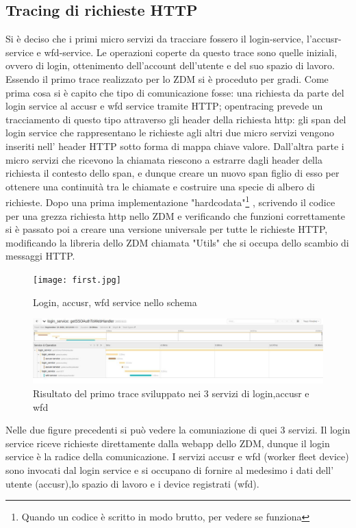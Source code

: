 \documentclass[a4paper,12pt,titlepage,italian,openany]{report}
\begin{document}
\subsection{Tracing di richieste HTTP}
Si è deciso che i primi micro servizi da tracciare fossero il login-service, l'accusr-service e wfd-service. Le operazioni coperte da questo trace sono quelle iniziali, ovvero di login, ottenimento dell'account dell'utente e del suo spazio di lavoro.
Essendo il primo trace realizzato per lo ZDM\cite{zdm:1} si è proceduto per gradi. Come prima cosa si è capito che tipo di comunicazione fosse: una richiesta da parte del login service al accusr e wfd service tramite HTTP;
opentracing\cite{opentracing:1} prevede un tracciamento di questo tipo attraverso gli header della richiesta http: gli span del login service che rappresentano le richieste agli altri due micro servizi vengono inseriti nell' header HTTP sotto forma di mappa chiave valore.
Dall'altra parte i micro servizi che ricevono la chiamata riescono a estrarre dagli header della richiesta il contesto dello span, e dunque creare un nuovo span figlio di esso per ottenere una continuità tra le chiamate e costruire una specie di albero di richieste.
Dopo una prima implementazione "hardcodata"\footnote[1]{Quando un codice è scritto in modo brutto, per vedere se funziona} , scrivendo il codice per una grezza richiesta http nello ZDM\cite{zdm:1} e verificando che funzioni correttamente si è passato poi a creare una versione universale per tutte le richieste HTTP, modificando la libreria dello ZDM\cite{zdm:1} chiamata "Utils" che si occupa dello scambio di messaggi HTTP.
\begin{figure}[H]
    \texttt{[image: first.jpg]}
    \centering
    \caption{Login, accusr, wfd service nello schema}
\end{figure}

\begin{figure}[H]
    \includegraphics[scale = 0.4]{43.jpg}
    \centering
    \caption{Risultato del primo trace sviluppato nei 3 servizi di login,accusr e wfd}
\end{figure}
Nelle due figure precedenti si può vedere la comuniazione di quei 3 servizi. Il login service riceve richieste direttamente dalla webapp dello ZDM\cite{zdm:1}, dunque il login service è la radice della comunicazione. I servizi accusr e wfd (worker fleet device) sono invocati dal login service e si occupano di fornire al medesimo i dati dell' utente (accusr),lo spazio di lavoro e i device registrati (wfd).
\end{document}
